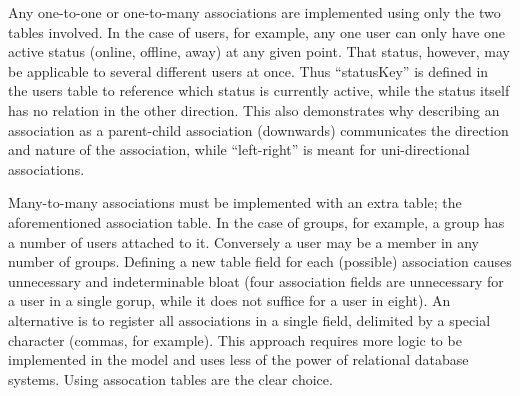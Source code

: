 Any one-to-one or one-to-many associations are implemented using only the two tables involved. In the case of users, for example, any one user can only have one active status (online, offline, away) at any given point. That status, however, may be applicable to several different users at once. Thus ``statusKey'' is defined in the users table to reference which status is currently active, while the status itself has no relation in the other direction. This also demonstrates why describing an association as a parent-child association (downwards) communicates the direction and nature of the association, while ``left-right'' is meant for uni-directional associations.

Many-to-many associations must be implemented with an extra table; the aforementioned association table. In the case of groups, for example, a group has a number of users attached to it. Conversely a user may be a member in any number of groups. Defining a new table field for each (possible) association causes unnecessary and indeterminable bloat (four association fields are unnecessary for a user in a single gorup, while it does not suffice for a user in eight). An alternative is to register all associations in a single field, delimited by a special character (commas, for example). This approach requires more logic to be implemented in the model and uses less of the power of relational database systems. Using assocation tables are the clear choice.